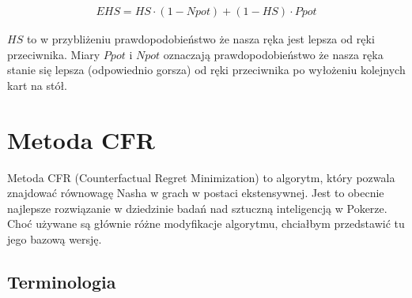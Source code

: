 \documentclass[licencjacka]{pracamgr}
\begin{document}
\begin{align*}
EHS = HS \cdot (1 - Npot) + (1 - HS) \cdot Ppot
\end{align*}

\noindent
$HS$ to w przybliżeniu prawdopodobieństwo że nasza ręka jest lepsza od ręki przeciwnika. Miary $Ppot$ i $Npot$ oznaczają
prawdopodobieństwo że nasza ręka stanie się lepsza (odpowiednio gorsza) od ręki przeciwnika po wyłożeniu kolejnych kart na stół. \\



\chapter{Metoda CFR}

Metoda CFR (Counterfactual Regret Minimization) to algorytm, który pozwala znajdować równowagę Nasha
w grach w postaci ekstensywnej. Jest to obecnie najlepsze rozwiązanie w dziedzinie badań nad
sztuczną inteligencją w Pokerze. Choć używane są głównie różne modyfikacje algorytmu, chciałbym
przedstawić tu jego bazową wersję.

\section{Terminologia}
\end{document}
